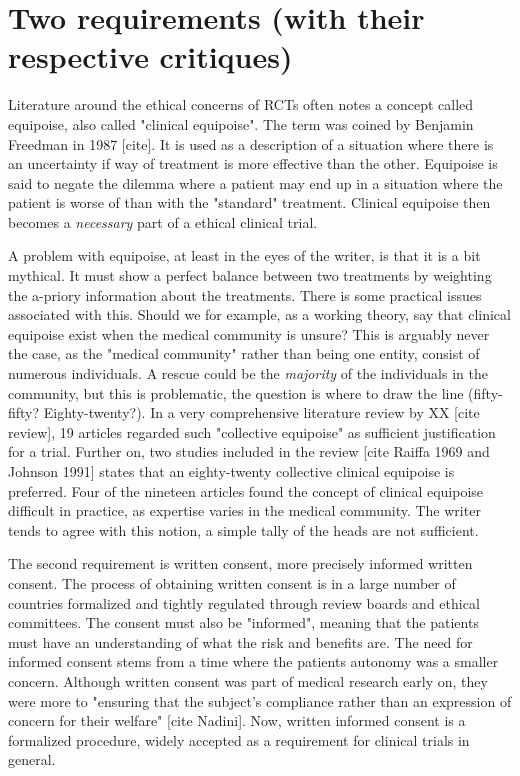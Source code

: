 \documentclass[12p]{article}
\begin{document}
\section*{Two requirements (with their respective critiques)}

Literature around the ethical concerns of RCTs often notes a concept called equipoise, also called "clinical equipoise".
The term was coined by Benjamin Freedman in 1987 [cite].
It is used as a description of a situation where there is an uncertainty if way of treatment is more effective than the other.
Equipoise is said to negate the dilemma where a patient may end up in a situation where the patient is worse of than with the "standard" treatment.
Clinical equipoise then becomes a \emph{necessary} part of a ethical clinical trial.

A problem with equipoise, at least in the eyes of the writer, is that it is a bit mythical.
It must show a perfect balance between two treatments by weighting the a-priory information about the treatments.
There is some practical issues associated with this.
Should we for example, as a working theory, say that clinical equipoise exist when the medical community is unsure?
This is arguably never the case, as the "medical community" rather than being one entity, consist of numerous individuals.
A rescue could be the \emph{majority} of the individuals in the community, but this is problematic, the question is where to draw the line (fifty-fifty? Eighty-twenty?).
In a very comprehensive literature review by XX [cite review], 19 articles regarded such "collective equipoise" as sufficient justification for a trial.
Further on, two studies included in the review [cite Raiffa 1969 and Johnson 1991] states that an eighty-twenty collective clinical equipoise is preferred.
Four of the nineteen articles found the concept of clinical equipoise difficult in practice, as expertise varies in the medical community.
The writer tends to agree with this notion, a simple tally of the heads are not sufficient.

The second requirement is written consent, more precisely informed written consent.
The process of obtaining written consent is in a large number of countries formalized and tightly regulated through review boards and ethical committees.
The consent must also be "informed", meaning that the patients must have an understanding of what the risk and benefits are.
The need for informed consent stems from a time where the patients autonomy was a smaller concern.
Although written consent was part of medical research early on, they were more to "ensuring that the subject's compliance rather than an expression of concern for their welfare" [cite Nadini].
Now, written informed consent is a formalized procedure, widely accepted as a requirement for clinical trials in general.
\end{document}
